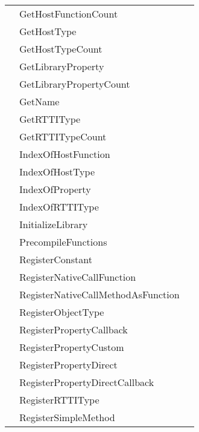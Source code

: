 \begin{tabularx}{\textwidth}{llX}
\pageref{thoriumcore:thorium:tthoriumlibrary:gethostfunctioncount} & GetHostFunctionCount  &  \\
\pageref{thoriumcore:thorium:tthoriumlibrary:gethosttype} & GetHostType  &  \\
\pageref{thoriumcore:thorium:tthoriumlibrary:gethosttypecount} & GetHostTypeCount  &  \\
\pageref{thoriumcore:thorium:tthoriumlibrary:getlibraryproperty} & GetLibraryProperty  &  \\
\pageref{thoriumcore:thorium:tthoriumlibrary:getlibrarypropertycount} & GetLibraryPropertyCount  &  \\
\pageref{thoriumcore:thorium:tthoriumlibrary:getname} & GetName  &  \\
\pageref{thoriumcore:thorium:tthoriumlibrary:getrttitype} & GetRTTIType  &  \\
\pageref{thoriumcore:thorium:tthoriumlibrary:getrttitypecount} & GetRTTITypeCount  &  \\
\pageref{thoriumcore:thorium:tthoriumlibrary:indexofhostfunction} & IndexOfHostFunction  &  \\
\pageref{thoriumcore:thorium:tthoriumlibrary:indexofhosttype} & IndexOfHostType  &  \\
\pageref{thoriumcore:thorium:tthoriumlibrary:indexofproperty} & IndexOfProperty  &  \\
\pageref{thoriumcore:thorium:tthoriumlibrary:indexofrttitype} & IndexOfRTTIType  &  \\
\pageref{thoriumcore:thorium:tthoriumlibrary:initializelibrary} & InitializeLibrary  &  \\
\pageref{thoriumcore:thorium:tthoriumlibrary:precompilefunctions} & PrecompileFunctions  &  \\
\pageref{thoriumcore:thorium:tthoriumlibrary:registerconstant} & RegisterConstant  &  \\
\pageref{thoriumcore:thorium:tthoriumlibrary:registernativecallfunction} & RegisterNativeCallFunction  &  \\
\pageref{thoriumcore:thorium:tthoriumlibrary:registernativecallmethodasfunction} & RegisterNativeCallMethodAsFunction  &  \\
\pageref{thoriumcore:thorium:tthoriumlibrary:registerobjecttype} & RegisterObjectType  &  \\
\pageref{thoriumcore:thorium:tthoriumlibrary:registerpropertycallback} & RegisterPropertyCallback  &  \\
\pageref{thoriumcore:thorium:tthoriumlibrary:registerpropertycustom} & RegisterPropertyCustom  &  \\
\pageref{thoriumcore:thorium:tthoriumlibrary:registerpropertydirect} & RegisterPropertyDirect  &  \\
\pageref{thoriumcore:thorium:tthoriumlibrary:registerpropertydirectcallback} & RegisterPropertyDirectCallback  &  \\
\pageref{thoriumcore:thorium:tthoriumlibrary:registerrttitype} & RegisterRTTIType  &  \\
\pageref{thoriumcore:thorium:tthoriumlibrary:registersimplemethod} & RegisterSimpleMethod  &  \\
\hline
\end{tabularx}
